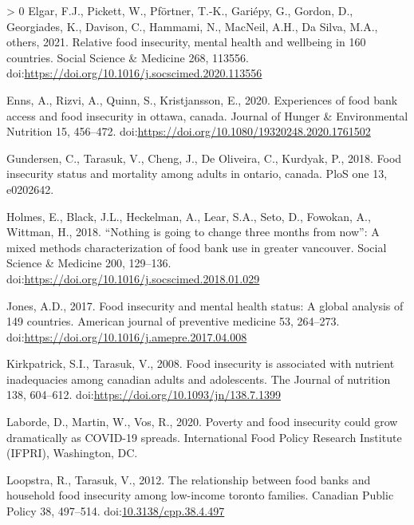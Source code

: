 \documentclass[]{elsarticle} %
\newlength{\cslhangindent}
\newenvironment{CSLReferences}[3] %
 {%
  \setlength{\parindent}{0pt}
  \ifodd #1 \everypar{\setlength{\hangindent}{\cslhangindent}}\ignorespaces\fi
  \ifnum #2 > 0
  \setlength{\parskip}{#2\baselineskip}
  \fi
 }%
 {}
\begin{document}
\begin{CSLReferences}{1}{0}
\leavevmode\hypertarget{ref-elgar2021relative}{}%
Elgar, F.J., Pickett, W., Pförtner, T.-K., Gariépy, G., Gordon, D.,
Georgiades, K., Davison, C., Hammami, N., MacNeil, A.H., Da Silva, M.A.,
others, 2021. Relative food insecurity, mental health and wellbeing in
160 countries. Social Science \& Medicine 268, 113556.
doi:\url{https://doi.org/10.1016/j.socscimed.2020.113556}

\leavevmode\hypertarget{ref-enns2020experiences}{}%
Enns, A., Rizvi, A., Quinn, S., Kristjansson, E., 2020. Experiences of
food bank access and food insecurity in ottawa, canada. Journal of
Hunger \& Environmental Nutrition 15, 456--472.
doi:\url{https://doi.org/10.1080/19320248.2020.1761502}

\leavevmode\hypertarget{ref-gundersen2018food}{}%
Gundersen, C., Tarasuk, V., Cheng, J., De Oliveira, C., Kurdyak, P.,
2018. Food insecurity status and mortality among adults in ontario,
canada. PloS one 13, e0202642.

\leavevmode\hypertarget{ref-holmes2018nothing}{}%
Holmes, E., Black, J.L., Heckelman, A., Lear, S.A., Seto, D., Fowokan,
A., Wittman, H., 2018. {``Nothing is going to change three months from
now''}: A mixed methods characterization of food bank use in greater
vancouver. Social Science \& Medicine 200, 129--136.
doi:\url{https://doi.org/10.1016/j.socscimed.2018.01.029}

\leavevmode\hypertarget{ref-jones2017food}{}%
Jones, A.D., 2017. Food insecurity and mental health status: A global
analysis of 149 countries. American journal of preventive medicine 53,
264--273. doi:\url{https://doi.org/10.1016/j.amepre.2017.04.008}

\leavevmode\hypertarget{ref-kirkpatrick2008food}{}%
Kirkpatrick, S.I., Tarasuk, V., 2008. Food insecurity is associated with
nutrient inadequacies among canadian adults and adolescents. The Journal
of nutrition 138, 604--612.
doi:\url{https://doi.org/10.1093/jn/138.7.1399}

\leavevmode\hypertarget{ref-laborde2020poverty}{}%
Laborde, D., Martin, W., Vos, R., 2020. Poverty and food insecurity
could grow dramatically as COVID-19 spreads. International Food Policy
Research Institute (IFPRI), Washington, DC.

\leavevmode\hypertarget{ref-loopstra2012relationship}{}%
Loopstra, R., Tarasuk, V., 2012. The relationship between food banks and
household food insecurity among low-income toronto families. Canadian
Public Policy 38, 497--514.
doi:\href{https://doi.org/10.3138/cpp.38.4.497}{10.3138/cpp.38.4.497}


\end{CSLReferences}
\end{document}
